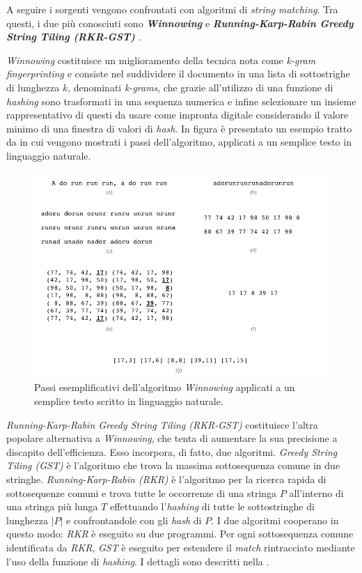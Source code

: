 A seguire i sorgenti vengono confrontati con algoritmi di \textit{string matching}.
%
Tra questi, i due più conosciuti sono \textbf{\textit{Winnowing}} \cite{winnowing} e \textbf{\textit{Running-Karp-Rabin Greedy String Tiling (RKR-GST)}} \cite{wise-running-93}.

\textit{Winnowing} costituisce un miglioramento della tecnica nota come \textit{k-gram fingerprinting} e consiste nel suddividere il documento in una lista di sottostrighe di lunghezza $k$, denominati \textit{k-grams}, che grazie all'utilizzo di una funzione di \textit{hashing} sono trasformati in una sequenza numerica e infine selezionare un insieme rappresentativo di questi da usare come impronta digitale considerando il valore minimo di una finestra di valori di \textit{hash}.
%
In figura  è presentato un esempio tratto da \cite{winnowing} in cui vengono mostrati i passi dell'algoritmo, applicati a un semplice testo in linguaggio naturale.

\begin{figure}[h!]
    \centering
    \includegraphics[width=\textwidth]{resources/img/01-winnowing-example.pdf}
    \caption{Passi esemplificativi dell'algoritmo \textit{Winnowing} applicati a un semplice testo scritto in linguaggio naturale.}
    \label{img:01-winnowing-example}
\end{figure}

\textit{Running-Karp-Rabin Greedy String Tiling (RKR-GST)} costituisce l'altra popolare alternativa a \textit{Winnowing}, che tenta di aumentare la sua precisione a discapito dell'efficienza. 
%
Esso incorpora, di fatto, due algoritmi.
%
\textit{Greedy String Tiling (GST)} è l'algoritmo che trova la massima sottosequenza comune in due stringhe.
%
\textit{Running-Karp-Rabin (RKR)} è l'algoritmo per la ricerca rapida di sottosequenze comuni e trova tutte le occorrenze di una stringa $P$ all'interno di una stringa più lunga $T$ effettuando l'\textit{hashing} di tutte le sottostringhe di lunghezza $|P|$ e confrontandole con gli \textit{hash} di $P$.
%
I due algoritmi cooperano in questo modo: \textit{RKR} è eseguito su due programmi.
%
Per ogni sottosequenza comune identificata da \textit{RKR}, \textit{GST} è eseguito per estendere il \textit{match} rintracciato mediante l'uso della funzione di \textit{hashing}.
%
I dettagli sono descritti nella .

